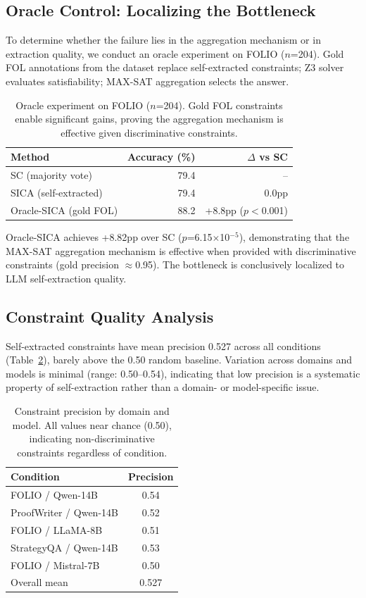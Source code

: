 \documentclass[11pt,a4paper]{article}
\begin{document}
\subsection{Oracle Control: Localizing the Bottleneck}

To determine whether the failure lies in the aggregation mechanism or in extraction quality, we conduct an oracle experiment on FOLIO ($n$=204). Gold FOL annotations from the dataset replace self-extracted constraints; Z3 solver evaluates satisfiability; MAX-SAT aggregation selects the answer.

\begin{table}[h]
\centering
\small
\caption{Oracle experiment on FOLIO ($n$=204). Gold FOL constraints enable significant gains, proving the aggregation mechanism is effective given discriminative constraints.}
\label{tab:oracle}
\begin{tabular}{lrr}
\toprule
Method & Accuracy (\%) & $\Delta$ vs SC \\
\midrule
SC (majority vote) & 79.4 & -- \\
SICA (self-extracted) & 79.4 & 0.0pp \\
Oracle-SICA (gold FOL) & 88.2 & +8.8pp ($p<$0.001) \\
\bottomrule
\end{tabular}
\end{table}

Oracle-SICA achieves +8.82pp over SC ($p$=6.15$\times$10$^{-5}$), demonstrating that the MAX-SAT aggregation mechanism is effective when provided with discriminative constraints (gold precision $\approx$0.95). The bottleneck is conclusively localized to LLM self-extraction quality.

\subsection{Constraint Quality Analysis}

Self-extracted constraints have mean precision 0.527 across all conditions (Table~\ref{tab:precision}), barely above the 0.50 random baseline. Variation across domains and models is minimal (range: 0.50--0.54), indicating that low precision is a systematic property of self-extraction rather than a domain- or model-specific issue.

\begin{table}[h]
\centering
\small
\caption{Constraint precision by domain and model. All values near chance (0.50), indicating non-discriminative constraints regardless of condition.}
\label{tab:precision}
\begin{tabular}{lc}
\toprule
Condition & Precision \\
\midrule
FOLIO / Qwen-14B & 0.54 \\
ProofWriter / Qwen-14B & 0.52 \\
FOLIO / LLaMA-8B & 0.51 \\
StrategyQA / Qwen-14B & 0.53 \\
FOLIO / Mistral-7B & 0.50 \\
\midrule
Overall mean & 0.527 \\
\bottomrule
\end{tabular}
\end{table}
\end{document}

